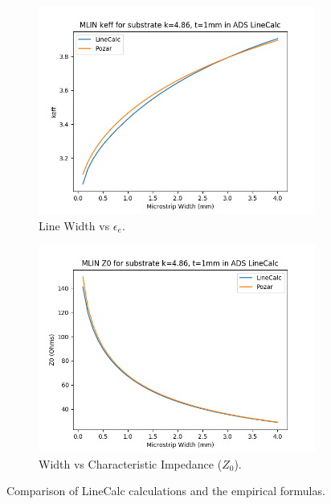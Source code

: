 \documentclass[10pt,a4paper]{article}
\begin{document}
    \begin{figure}[htb!]
        \centering
        \begin{subfigure}{.5\textwidth}
            \centering
            \includegraphics[width=\linewidth]{keff.png}
            \caption{Line Width vs $\epsilon_e$.}
            \label{keff_comp}
        \end{subfigure}%
        \begin{subfigure}{.5\textwidth}
            \centering
            \includegraphics[width=\linewidth]{z0.png}
            \caption{Width vs Characteristic Impedance ($Z_0$).}
            \label{fig:z0_comp}
        \end{subfigure}
        \caption{Comparison of LineCalc calculations and the empirical formulas.}
        \label{fig:linecalc_comp}
    \end{figure}
\end{document}
